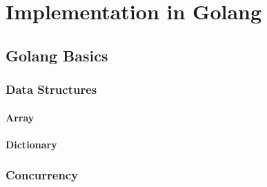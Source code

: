 \documentclass[12pt, a4paper, twoside, titlepage]{book}
\begin{document}
\chapter{Implementation in Golang}
\section{Golang Basics}
    \subsection{Data Structures}
        \subsubsection{Array}
        \subsubsection{Dictionary}
    \subsection{Concurrency}
\end{document}
